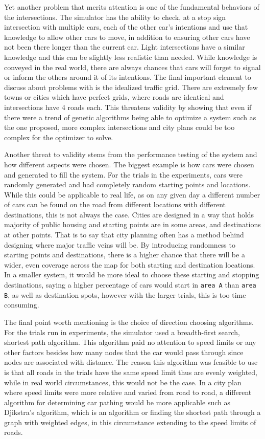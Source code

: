 Yet another problem that merits attention is one of the fundamental behaviors of the intersections.  The simulator has the ability to check, at a stop sign intersection with multiple cars, each of the other car's intentions and use that knowledge to allow other cars to move, in addition to ensuring other cars have not been there longer than the current car.  Light intersections have a similar knowledge and this can be slightly less realistic than needed.  While knowledge is conveyed in the real world, there are always chances that cars will forget to signal or inform the others around it of its intentions.  The final important element to discuss about problems with is the idealized traffic grid.  There are extremely few towns or cities which have perfect grids, where roads are identical and intersections have 4 roads each.  This threatens validity by showing that even if there were a trend of genetic algorithms being able to optimize a system such as the one proposed, more complex intersections and city plans could be too complex for the optimizer to solve.

Another threat to validity stems from the performance testing of the system and how different aspects were chosen.  The biggest example is how cars were chosen and generated to fill the system.  For the trials in the experiments, cars were randomly generated and had completely random starting points and locations.  While this could be applicable to real life, as on any given day a different number of cars can be found on the road from different locations with different destinations, this is not always the case.  Cities are designed in a way that holds majority of public housing and starting points are in some areas, and destinations at other points.  That is to say that city planning often has a method behind designing where major traffic veins will be.  By introducing randomness to starting points and destinations, there is a higher chance that there will be a wider, even coverage across the map for both starting and destination locations.  In a smaller system, it would be more ideal to choose these starting and stopping destinations, saying a higher percentage of cars would start in \texttt{area A} than \texttt{area B}, as well as destination spots, however with the larger trials, this is too time consuming.

The final point worth mentioning is the choice of direction choosing algorithms.  For the trials run in experiments, the simulator used a breadth-first search, shortest path algorithm.  This algorithm paid no attention to speed limits or any other factors besides how many nodes that the car would pass through since nodes are associated with distance.  The reason this algorithm was feasible to use is that all roads in the trials have the same speed limit thus are evenly weighted, while in real world circumstances, this would not be the case.  In a city plan where speed limits were more relative and varied from road to road, a different algorithm for determining car pathing would be more applicable such as Djikstra's algorithm, which is an algorithm or finding the shortest path through a graph with weighted edges, in this circumstance extending to the speed limits of roads.  
